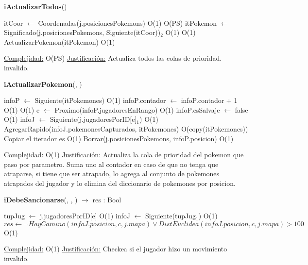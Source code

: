 \begin{algorithm}[H]{\textbf{iActualizarTodos}()} 
	\begin{algorithmic}
		\State itCoor $\gets$ Coordenadas(j.posicionesPokemons)	\Comment O(1)
			\Comment O(PS)
			\State itPokemon $\gets$ Significado(j.posicionesPokemons, Siguiente(itCoor))$_{2}$	\Comment O(1)
				\Comment O(1)
				\State ActualizarPokemon(itPokemon)	\Comment O(1)
			\EndIf
		\EndWhile

	
		\medskip
		\Statex \underline{Complejidad:} O(PS)
		\Statex \underline{Justificación:} Actualiza todos las colas de prioridad. invalido.
    \end{algorithmic}
\end{algorithm}

\begin{algorithm}[H]{\textbf{iActualizarPokemon}(, )} 
	\begin{algorithmic}
		\State infoP $\gets$ Siguiente(itPokemones)	\Comment O(1)
		\State infoP.contador $\gets$ infoP.contador + 1	\Comment O(1)
    	\Comment O(1)
			\State e $\gets$ Proximo(infoP.jugadoresEnRango)	\Comment O(1)
			\State infoP.esSalvaje $\gets$ false	\Comment O(1)
			\State infoJ $\gets$ Siguiente(j.jugadoresPorID[e]$_{1}$)	\Comment O(1)
			\State AgregarRapido(infoJ.pokemonesCapturados, itPokemones)	\Comment O(copy(itPokemones)) {Copiar el iterador es O(1)}
			\State Borrar(j.posicionesPokemons, infoP.posicion) \Comment O(1)
		\EndIf

	
		\medskip
		\Statex \underline{Complejidad:} O(1)
		\Statex \underline{Justificación:} Actualiza la cola de prioridad del pokemon que paso por parametro. Suma uno al contador en caso de que no tenga que atraparse, si tiene que ser atrapado, lo agrega al conjunto de pokemones atrapados del jugador y lo elimina del diccionario de pokemones por posicion.
    \end{algorithmic}
\end{algorithm}

\begin{algorithm}[H]{\textbf{iDebeSancionarse}(, , ) $\to$ res : Bool} 
	\begin{algorithmic}
    \State tupJug $\gets$ j.jugadoresPorID[e]	\Comment O(1)
  	\State infoJ $\gets$ Siguiente(tupJug$_{1}$)	\Comment O(1)
		\State $res \gets \neg HayCamino(infoJ.posicion, c, j.mapa) \lor DistEuclidea(infoJ.posicion, c, j.mapa) > 100 $ \Comment O(1)
	
		\medskip
		\Statex \underline{Complejidad:} O(1)
		\Statex \underline{Justificación:} Checkea si el jugador hizo un movimiento invalido.
    \end{algorithmic}
\end{algorithm}

